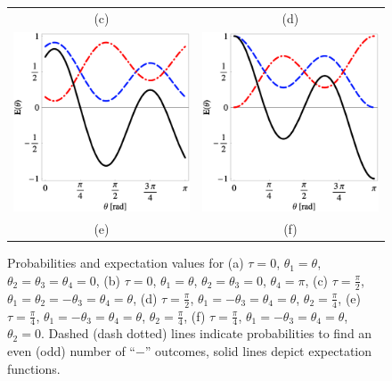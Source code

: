 \documentclass[rmp,amsfonts,showpacs,showkeys,preprint]{revtex4}
\begin{document}
\begin{figure}[htbp]
\begin{tabular}{cc}
\quad  \qquad (c)& \quad  \qquad (d)\\
  \includegraphics[width=60mm]{2005-gtq-fr1-5}&
  \includegraphics[width=60mm]{2005-gtq-fr1-6}\\
\quad  \qquad (e)& \quad  \qquad (f)\\
\end{tabular}
  \caption{Probabilities and expectation values for
(a)
$\tau =0$,
$\theta_1 =\theta$,
$\theta_2 =\theta_3 =\theta_4 =0$,
(b)
$\tau =0$,
$\theta_1 =\theta$,
$\theta_2 =\theta_3  =0$,
$\theta_4 =\pi$,
(c)
$\tau =\frac{\pi}{2}$,
$\theta_1 =\theta_2 =-\theta_3 =\theta_4  =\theta$,
(d)
$\tau =\frac{\pi}{2}$,
$\theta_1 =-\theta_3 =\theta_4  =\theta$,
$\theta_2 =\frac{\pi}{4}$,
(e)
$\tau =\frac{\pi}{4}$,
$\theta_1 =-\theta_3 =\theta_4  =\theta$,
$\theta_2 =\frac{\pi}{4}$,
(f)
$\tau =\frac{\pi}{4}$,
$\theta_1 =- \theta_3=\theta_4 =\theta$,
$ \theta_2 =0$.
Dashed (dash dotted) lines indicate probabilities to find an even (odd)
number of ``$-$'' outcomes, solid lines depict expectation functions.
}
\label{2005-gtq-fpe}
\end{figure}
\end{document}
